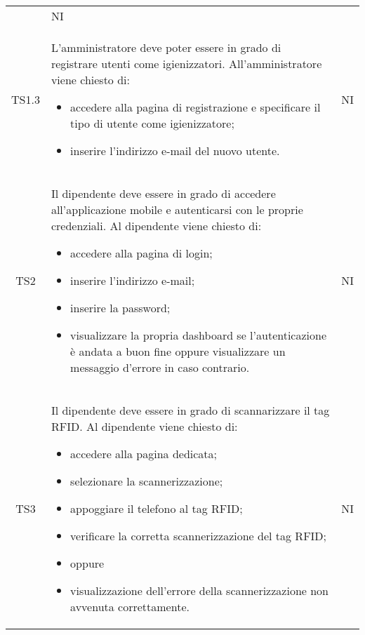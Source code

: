{\begin{longtable}{ c C{11cm} c }
\begin{itemize}
        \end{itemize}&
        NI\\

        TS1.3&
        \begin{flushleft}
            L'amministratore deve poter essere in grado di registrare utenti come igienizzatori.
            All'amministratore viene chiesto di:
        \end{flushleft}
        \begin{itemize}
            \item accedere alla pagina di registrazione e specificare il tipo di utente come igienizzatore;
            \item inserire l'indirizzo e-mail del nuovo utente.
            
        \end{itemize}&
        NI\\

        TS2&
        \begin{flushleft}
             Il dipendente deve essere in grado di accedere all'applicazione mobile e autenticarsi con le proprie credenziali.
             Al dipendente viene chiesto di:
        \end{flushleft}
        \begin{itemize}
            \item accedere alla pagina di login;
            \item inserire l'indirizzo e-mail;
            \item inserire la password;
            \item visualizzare la propria dashboard se l'autenticazione è andata a buon fine oppure visualizzare un messaggio d'errore in caso contrario.
        \end{itemize}&
        NI\\

        TS3&
        \begin{flushleft}
            Il dipendente deve essere in grado di scannarizzare il tag RFID.
            Al dipendente viene chiesto di:
        \end{flushleft}
        \begin{itemize}
            \item accedere alla pagina dedicata;
            \item selezionare la scannerizzazione;
            \item appoggiare il telefono al tag RFID;
            \item verificare la corretta scannerizzazione del tag RFID;
            \item [] oppure
            \item visualizzazione dell'errore della scannerizzazione non avvenuta correttamente.
        \end{itemize}&
        NI\\


\end{longtable}}
